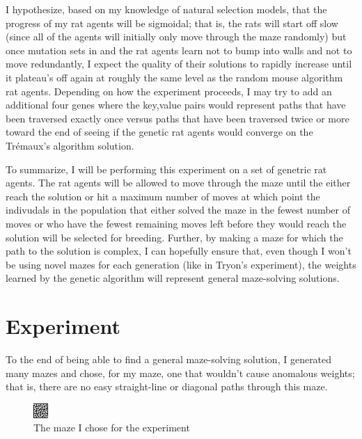 \documentclass[12pt]{article}
\begin{document}
 \hspace*{\parindent} I hypothesize, based on my knowledge of natural selection models, that the progress of my rat agents will be sigmoidal; that is, the rats will start off slow (since all of the agents will initially only move through the maze randomly) but once mutation sets in and the rat agents learn not to bump into walls and not to move redundantly, I expect the quality of their solutions to rapidly increase until it plateau's off again at roughly the same level as the random mouse algorithm rat agents. Depending on how the experiment proceeds, I may try to add an additional four genes where the key,value pairs would represent paths that have been traversed exactly once versus paths that have been traversed twice or more toward the end of seeing if the genetic rat agents would converge on the Tr\'{e}maux's algorithm solution.

\hspace*{\parindent} To summarize, I will be performing this experiment on a set of genetric rat agents. The rat agents will be allowed to move through the maze until the either reach the solution or hit a maximum number of moves at which point the indivudals in the population that either solved the maze in the fewest number of moves or who have the fewest remaining moves left before they would reach the solution will be selected for breeding. Further, by making a maze for which the path to the solution is complex, I can hopefully ensure that, even though I won't be using novel mazes for each generation (like in Tryon's experiment), the weights learned by the genetic algorithm will represent general maze-solving solutions.

\section{Experiment}

\hspace*{\parindent}  To the end of being able to find a general maze-solving solution, I generated many mazes and chose, for my maze, one that wouldn't cause anomalous weights; that is, there are no easy straight-line or diagonal paths through this maze.

\begin{figure}[H]
	\centering
	\includegraphics[width=0.4\linewidth]{1.png}
	\caption {The maze I chose for the experiment}
\end{figure}
\end{document}
